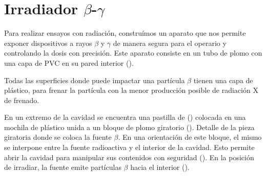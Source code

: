 \section{Irradiador $\beta$-$\gamma$}
Para realizar ensayos con radiación,
construímos un aparato que nos permite exponer dispositivos a rayos $\beta$ y
$\gamma$ de manera segura para el operario y controlando la dosis con precisión.
Este aparato consiste en un tubo de plomo con una capa de PVC en su pared
interior ().

Todas las superficies donde puede impactar una partícula $\beta$ tienen una
capa de plástico,
para frenar la partícula con la menor producción posible de
radiación X de frenado.

En un extremo de la cavidad se encuentra una pastilla de \Strontium 
()
colocada en una mochila de plástico unida a un bloque de plomo giratorio
().
{Detalle de la pieza giratoria donde se coloca la fuente $\beta$.}
En una orientación de este bloque,
el mismo se interpone entre la fuente radioactiva y el interior de la cavidad.
Esto permite abrir la cavidad para manipular sus contenidos con seguridad
().
En la posición de irradiar, la fuente emite partículas $\beta$ hacia el interior
().

